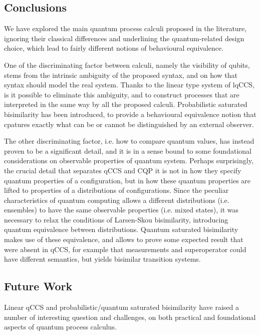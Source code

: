\subsection{Conclusions}
We have explored the main  quantum process calculi proposed in the literature, ignoring their classical differences and underlining the quantum-related design choice, which lead to fairly different notions of behavioural equivalence.

One of the discriminating factor between calculi, namely the visibility of qubits, stems from the intrinsic ambiguity of the proposed syntax, and on how that syntax should model the real system. Thanks to the linear type system of lqCCS, is it possible to eliminate this ambiguity, and to construct processes that are interpreted in the same way by all the proposed calculi. Probabilistic saturated bisimilarity has been introduced, to provide a behavioural equivalence notion that cpatures exactly what can  be or cannot be distinguished by an external observer.

The other discriminating factor, i.e. how to compare quantum values, has instead proven to be a significant detail, and it is in a sense bound to some foundational considerations on observable properties of quantum system. Perhaps surprisingly, the crucial detail that separates qCCS and CQP it is not in how they specify quantum properties of a configuration, but in how these quantum properties are lifted to properties of a distributions of configurations. Since the peculiar characteristics of quantum computing allows a different distributions (i.e. ensembles) to have the same observable properties (i.e. mixed states), it was necessary to relax the conditions of Larsen-Skou bisimilarity, introducing quantum equivalence between distributions. Quantum saturated bisimilarity makes use of these equivalence, and allows to prove some expected result that were absent in qCCS, for example that measurements and superoperator could have different semantics, but yields bisimilar transition systems. 
\subsection*{Future Work}
Linear qCCS and probabilistic/quantum saturated bisimilarity have raised a number of interesting question and challenges, on both practical and foundational aspects of quantum process calculus.

